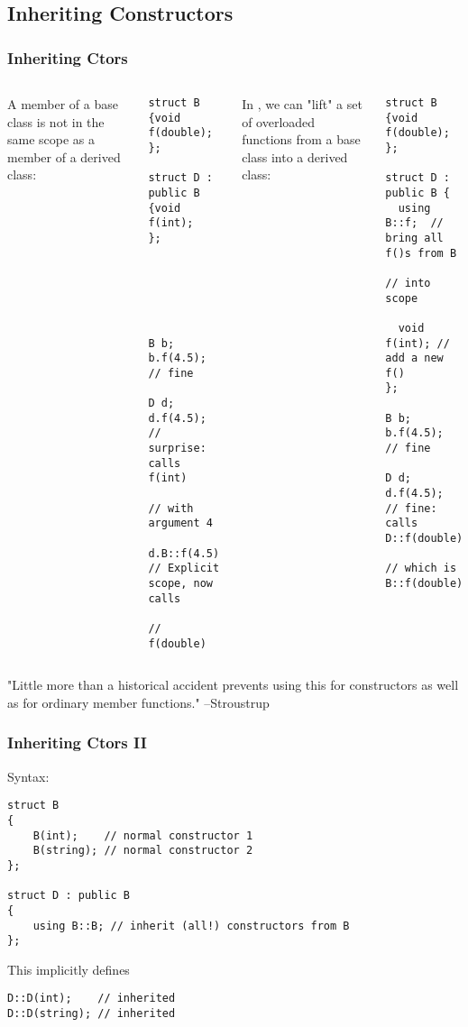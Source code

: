 \subsection{Inheriting Constructors}

\begin{frame}[fragile]
\frametitle{Inheriting Ctors}

\begin{columns}[t]
A member of a base class is not in the same scope as a member of a derived class:
{\scriptsize
\begin{verbatim}
struct B            {void f(double); };

struct D : public B {void f(int);    };






B b;   b.f(4.5);  // fine

D d;   d.f(4.5);  // surprise: calls f(int)
                  // with argument 4

d.B::f(4.5)  // Explicit scope, now calls
             // f(double)
\end{verbatim}
}
\pause{}
In , we can "lift" a set of overloaded functions from a base class into a derived class:
{\scriptsize
\begin{verbatim}
struct B {void f(double);  };

struct D : public B {
  using B::f;  // bring all f()s from B
               // into scope

  void f(int); // add a new f()
};

B b;   b.f(4.5); // fine

D d;   d.f(4.5); // fine: calls D::f(double)
                 // which is B::f(double)
\end{verbatim}
}
\end{columns}
\pause{}
\vskip 24pt
"Little more than a historical accident prevents using this for
constructors as well as for ordinary member functions." --Stroustrup
\end{frame}

\begin{frame}[fragile]
\frametitle{Inheriting Ctors II}

Syntax:


{\scriptsize
\begin{verbatim}
struct B
{
    B(int);    // normal constructor 1
    B(string); // normal constructor 2
};

struct D : public B
{
    using B::B; // inherit (all!) constructors from B
};
\end{verbatim}
}
This implicitly defines
{\scriptsize
\begin{verbatim}
D::D(int);    // inherited
D::D(string); // inherited
\end{verbatim}
}
\end{frame}

